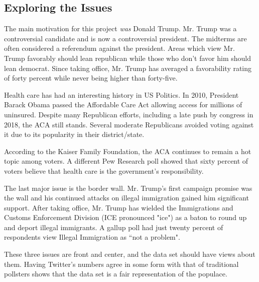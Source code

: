 \documentclass[11pt, twoside, reqno]{book}
\begin{document}
\subsection{Exploring the Issues}
\label{subsec:exploring the issues}
\hspace{0.2in}The main motivation for this project \textit{was} Donald Trump. Mr. Trump was a controversial candidate and is now a controversial president. The midterms are often considered a referendum against the president. Areas which view Mr. Trump favorably should lean republican while those who don't favor him should lean democrat. Since taking office, Mr. Trump has averaged a favorability rating of forty percent while never being higher than forty-five\cite{gallup}. 

Health care has had an interesting history in US Politics. In 2010, President Barack Obama passed the Affordable Care Act allowing access for millions of uninsured. Despite many Republican efforts, including a late push by congress in 2018, the ACA still stands. Several moderate Republicans avoided voting against it due to its popularity in their district/state. 

According to the Kaiser Family Foundation, the ACA continues to remain a hot topic among voters\cite{kff}. A different Pew Research poll showed that sixty percent of voters believe that health care is the government's responsibility\cite{gallup_immigration}. 

The last major issue is the border wall. Mr. Trump's first campaign promise was the wall and his continued attacks on illegal immigration gained him significant support. After taking office, Mr. Trump has wielded the Immigrations and Customs Enforcement Division (ICE pronounced "ice") as a baton to round up and deport illegal immigrants. A gallup poll had just twenty percent of respondents view Illegal Immigration as ``not a problem". 

These three issues are front and center, and the data set should have views about them. Having Twitter's numbers agree in some form with that of traditional pollsters shows that the data set is a fair representation of the populace. 
\end{document}
